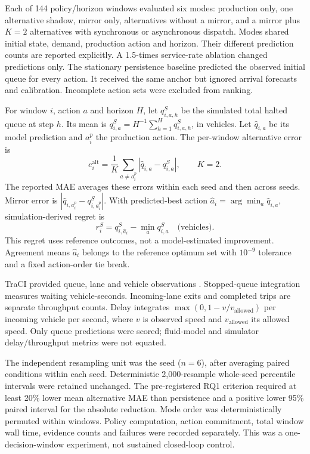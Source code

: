 \documentclass[conference,letterpaper]{IEEEtran}
\begin{document}
Each of 144 policy/horizon windows evaluated six modes: production only, one
alternative shadow, mirror only, alternatives without a mirror, and a mirror
plus $K=2$ alternatives with synchronous or asynchronous dispatch. Modes shared
initial state, demand, production action and horizon. Their different prediction
counts are reported explicitly. A 1.5-times service-rate ablation changed
predictions only. The stationary persistence baseline predicted the observed
initial queue for every action. It received the same anchor but ignored arrival
forecasts and calibration. Incomplete action sets were excluded from ranking.

For window $i$, action $a$ and horizon $H$, let $q_{i,a,h}^{S}$ be the simulated
total halted queue at step $h$. Its mean is
$q_{i,a}^{S}=H^{-1}\sum_{h=1}^{H}q_{i,a,h}^{S}$, in vehicles.
Let $\widehat q_{i,a}$ be its model prediction and $a_i^p$ the production action.
The per-window alternative error is
\begin{equation}
 e_i^{\mathrm{alt}}=\frac{1}{K}\sum_{a\ne a_i^p}
 |\widehat q_{i,a}-q_{i,a}^{S}|,\qquad K=2.
 \label{eq:alternative-error}
\end{equation}
The reported MAE averages these errors within each seed and then across seeds.
Mirror error is $|\widehat q_{i,a_i^p}-q_{i,a_i^p}^{S}|$.
With predicted-best action $\widehat a_i=\arg\min_a\widehat q_{i,a}$,
simulation-derived regret is
\begin{equation}
 r_i^{S}=q_{i,\widehat a_i}^{S}-\min_a q_{i,a}^{S}
 \quad\text{(vehicles)}.
 \label{eq:simulator-regret}
\end{equation}
This regret uses reference outcomes, not a model-estimated improvement.
Agreement means $\widehat a_i$ belongs to the reference optimum set with
$10^{-9}$ tolerance and a fixed action-order tie break.

TraCI provided queue, lane and vehicle observations \cite{sumo-lanes}.
Stopped-queue integration measures waiting vehicle-seconds. Incoming-lane
exits and completed trips are separate throughput counts. Delay integrates
$\max(0,1-v/v_{\mathrm{allowed}})$ per incoming vehicle per second, where $v$
is observed speed and $v_{\mathrm{allowed}}$ its allowed speed. Only queue
predictions were scored; fluid-model and simulator delay/throughput metrics
were not equated.

The independent resampling unit was the seed ($n=6$), after averaging paired
conditions within each seed. Deterministic 2,000-resample whole-seed percentile
intervals were retained unchanged. The pre-registered RQ1 criterion required
at least 20\% lower mean alternative MAE than persistence and a positive lower
95\% paired interval for the absolute reduction. Mode order was deterministically
permuted within windows. Policy computation, action commitment, total window
wall time, evidence counts and failures were recorded separately. This was a
one-decision-window experiment, not sustained closed-loop control.
\end{document}
